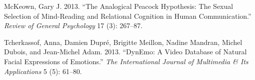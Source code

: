 \documentclass[conference,final,]{IEEEtran}
\begin{document}
\leavevmode\hypertarget{ref-mckeown2013analogical}{}%
McKeown, Gary J. 2013. ``The Analogical Peacock Hypothesis: The Sexual
Selection of Mind-Reading and Relational Cognition in Human
Communication.'' \emph{Review of General Psychology} 17 (3): 267--87.

\leavevmode\hypertarget{ref-tcherkassof2013dynemo}{}%
Tcherkassof, Anna, Damien Dupré, Brigitte Meillon, Nadine Mandran,
Michel Dubois, and Jean-Michel Adam. 2013. ``DynEmo: A Video Database of
Natural Facial Expressions of Emotions.'' \emph{The International
Journal of Multimedia \& Its Applications} 5 (5): 61--80.
\end{document}
